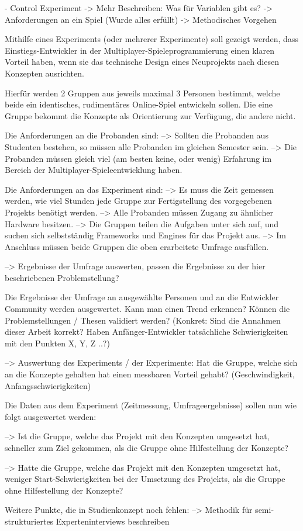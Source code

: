 	- Control Experiment -> Mehr Beschreiben: Was für Variablen gibt es?
	-> Anforderungen an ein Spiel (Wurde alles erfüllt)
	-> Methodisches Vorgehen
	
Mithilfe eines Experiments (oder mehrerer Experimente) soll gezeigt werden, dass Einstiegs-Entwickler in der Multiplayer-Spieleprogrammierung einen klaren Vorteil haben, wenn sie das technische Design eines Neuprojekts nach diesen Konzepten ausrichten.

Hierfür werden 2 Gruppen aus jeweils maximal 3 Personen bestimmt, welche beide ein identisches, rudimentäres Online-Spiel entwickeln sollen. Die eine Gruppe bekommt die Konzepte als Orientierung zur Verfügung, die andere nicht.

Die Anforderungen an die Probanden sind:
--> Sollten die Probanden aus Studenten bestehen, so müssen alle Probanden im gleichen Semester sein.
--> Die Probanden müssen gleich viel (am besten keine, oder wenig) Erfahrung im Bereich der Multiplayer-Spieleentwicklung haben.

Die Anforderungen an das Experiment sind:
--> Es muss die Zeit gemessen werden, wie viel Stunden jede Gruppe zur Fertigstellung des vorgegebenen Projekts benötigt werden.
--> Alle Probanden müssen Zugang zu ähnlicher Hardware besitzen.
--> Die Gruppen teilen die Aufgaben unter sich auf, und suchen sich selbstständig Frameworks und Engines für das Projekt aus.
--> Im Anschluss müssen beide Gruppen die oben erarbeitete Umfrage ausfüllen.


	--> Ergebnisse der Umfrage auswerten, passen die Ergebnisse zu der hier beschriebenen Problemstellung?

Die Ergebnisse der Umfrage an ausgewählte Personen und an die Entwickler Community werden ausgewertet. Kann man einen Trend erkennen? Können die Problemstellungen / Thesen validiert werden? 
(Konkret: Sind die Annahmen dieser Arbeit korrekt? Haben Anfänger-Entwickler tatsächliche Schwierigkeiten mit den Punkten X, Y, Z ..?)

	--> Auswertung des Experiments / der Experimente: Hat die Gruppe, welche sich an die Konzepte gehalten hat einen messbaren Vorteil gehabt? (Geschwindigkeit, Anfangsschwierigkeiten)
	
Die Daten aus dem Experiment (Zeitmessung, Umfrageergebnisse) sollen nun wie folgt ausgewertet werden:

--> Ist die Gruppe, welche das Projekt mit den Konzepten umgesetzt hat, schneller zum Ziel gekommen, als die Gruppe ohne Hilfestellung der Konzepte?

--> Hatte die Gruppe, welche das Projekt mit den Konzepten umgesetzt hat, weniger Start-Schwierigkeiten bei der Umsetzung des Projekts, als die Gruppe ohne Hilfestellung der Konzepte?


Weitere Punkte, die in Studienkonzept noch fehlen:
--> Methodik für semi-strukturiertes Experteninterviews beschreiben







